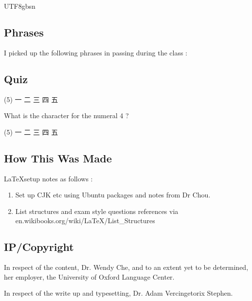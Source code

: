 \documentclass{article}
\newcommand{\myfont}{gbsn} %
\begin{document}
\begin{CJK}{UTF8}{\myfont}
\subsection{Phrases}
I picked up the following phrases in passing during the class :

\subsection{Quiz}

\begin{tasks}(5)
  \task 一
  \task 二
  \task 三
  \task 四
  \task 五
\end{tasks}

\begin{question}
  What is the character for the numeral 4 ?
  \begin{tasks}(5)
  \task 一
  \task 二
  \task 三
  \task 四
  \task 五
\end{tasks}

\end{question}


\subsection{How This Was Made}

\LaTeX setup notes as follows :

\begin{enumerate}
\item Set up CJK etc using Ubuntu packages and notes from Dr Chou.
\item List structures and exam style questions references via en.wikibooks.org/wiki/LaTeX/List\_Structures
\end{enumerate}

\subsection{IP/Copyright}

In respect of the content, Dr. Wendy Che, and to an extent yet to be determined, her employer, the University of Oxford Language Center.

In respect of the write up and typesetting, Dr. Adam Vercingetorix Stephen.


\end{CJK} 
\end{document}
